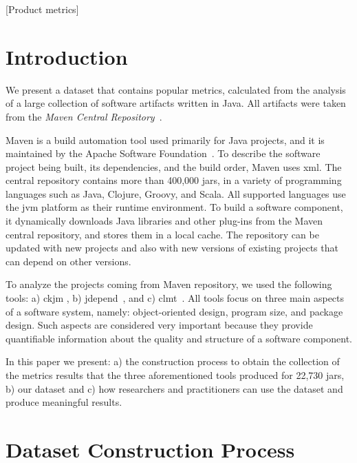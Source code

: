 \documentclass{sig-alternate}
\begin{document}
[Product metrics]



\section{Introduction}
\label{sec:intro}

We present a dataset that contains popular metrics, calculated from the analysis of a large collection of software artifacts written in Java. All artifacts were taken from the {\it Maven Central Repository}~\cite{MAVEN}.

Maven is a build automation tool used primarily for Java projects, and it is maintained by the Apache Software Foundation~\cite{MAVEN}. To describe the software project being built, its dependencies, and the build order, Maven uses {\sc xml}. The central repository contains more than 400,000 {\sc jar}s, in a variety of programming languages such as Java, Clojure, Groovy, and Scala. All supported languages use the {\sc jvm} platform as their runtime environment. To build a software component, it dynamically downloads Java libraries and other plug-ins from the Maven central repository, and stores them in a local cache. The repository can be updated with new projects and also with new versions of existing projects that can depend on other versions.

To analyze the projects coming from Maven repository, we used the following tools: a) {\sc ckjm} \cite{Spi05g}, b) {\sc jd}epend~\cite{JDEPEND}, and c) {\sc clmt}~\cite{SGKL09}. All tools focus on three main aspects of a software system, namely: object-oriented design, program size, and package design. Such aspects are considered very important because they provide quantifiable information about the quality and structure of a software component.

In this paper we present: a) the construction process to obtain the collection of the metrics results that the three aforementioned tools produced for 22,730 {\sc jar}s, b) our dataset and c) how researchers and practitioners can use the dataset and produce meaningful results.

\section{Dataset Construction Process}
\label{sec:data}
\end{document}
